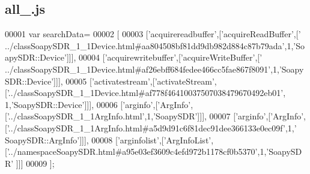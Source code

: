 \subsection{all\+\_.\+js}
\label{all__0_8js_source}

\begin{DoxyCode}
00001 var searchData=
00002 [
00003   [\textcolor{stringliteral}{'acquirereadbuffer'},[\textcolor{stringliteral}{'acquireReadBuffer'},[\textcolor{stringliteral}{'
      ../classSoapySDR\_1\_1Device.html#aa804508bf81dd9db982d884c87b79ada'},1,\textcolor{stringliteral}{'SoapySDR::Device'}]]],
00004   [\textcolor{stringliteral}{'acquirewritebuffer'},[\textcolor{stringliteral}{'acquireWriteBuffer'},[\textcolor{stringliteral}{'
      ../classSoapySDR\_1\_1Device.html#af26ebff684fedee466cc5fae867f8091'},1,\textcolor{stringliteral}{'SoapySDR::Device'}]]],
00005   [\textcolor{stringliteral}{'activatestream'},[\textcolor{stringliteral}{'activateStream'},[\textcolor{stringliteral}{'../classSoapySDR\_1\_1Device.html#af778f46410037507038479670492eb01'},
      1,\textcolor{stringliteral}{'SoapySDR::Device'}]]],
00006   [\textcolor{stringliteral}{'arginfo'},[\textcolor{stringliteral}{'ArgInfo'},[\textcolor{stringliteral}{'../classSoapySDR\_1\_1ArgInfo.html'},1,\textcolor{stringliteral}{'SoapySDR'}]]],
00007   [\textcolor{stringliteral}{'arginfo'},[\textcolor{stringliteral}{'ArgInfo'},[\textcolor{stringliteral}{'../classSoapySDR\_1\_1ArgInfo.html#a5d9d91c6f81dec91dee366133e0ec09f'},1,\textcolor{stringliteral}{'
      SoapySDR::ArgInfo'}]]],
00008   [\textcolor{stringliteral}{'arginfolist'},[\textcolor{stringliteral}{'ArgInfoList'},[\textcolor{stringliteral}{'../namespaceSoapySDR.html#a95e03ef3609c4efd972b1178cf0b5370'},1,\textcolor{stringliteral}{'SoapySDR'}
      ]]]
00009 ];
\end{DoxyCode}
